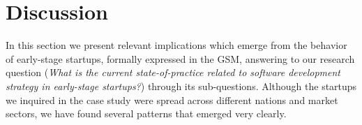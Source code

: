 \documentclass[10pt,journal,letterpaper,compsoc]{IEEEtran}
\begin{document}
\section{Discussion} %
\label{sect:theory:impl}



In this section we present relevant implications which 
emerge from the behavior of early-stage startups, formally expressed in the GSM, 
answering to our research question (\textit{What is the current 
state-of-practice related to software development strategy in early-stage 
startups?}) through its sub-questions. Although the startups we inquired in the 
case study were spread across different nations and market sectors, we have 
found several patterns that emerged very clearly.
\end{document}
